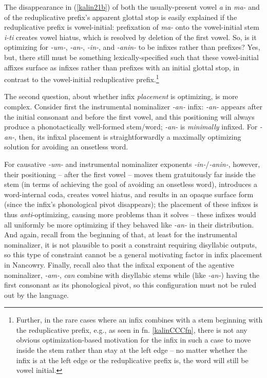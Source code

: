 \documentclass[output=paper]{langscibook}
\begin{document}
\noindent The disappearance in (\ref{kalin21b}) of both the usually-present vowel \textit{a} in \textit{ma-} and of the reduplicative prefix's apparent glottal stop is easily explained if the reduplicative prefix is vowel-initial: prefixation of \textit{ma-} onto the vowel-initial stem \textit{i-ti} creates vowel hiatus, which is resolved by deletion of the first vowel. So, is it optimizing for \textit{-um-}, \textit{-an-}, \textit{-in-}, and \textit{-anin-} to be infixes rather than prefixes? Yes, but, there still must be something lexically-specified such that these vowel-initial affixes surface as infixes rather than prefixes with an initial glottal stop, in contrast to the vowel-initial reduplicative prefix.\footnote{Further, in the rare cases where an infix combines with a stem beginning with the reduplicative prefix, e.g., as seen in fn. \ref{kalinCCCfn}, there is not any obvious optimization-based motivation for the infix in such a case to move inside the stem rather than stay at the left edge -- no matter whether the infix is at the left edge or the reduplicative prefix is, the word will still be vowel initial.}

The second question, about whether infix {\it placement} is optimizing, is more complex. Consider first the instrumental nominalizer \textit{-an-} infix: \textit{-an-} appears after the initial consonant and before the first vowel, and this positioning will always produce a phonotactically well-formed stem/word; \textit{-an-} is {\it minimally} infixed. For \textit{-an-}, then, its infixal placement is straightforwardly a maximally optimizing solution for avoiding an onsetless word. 

For causative \textit{-um-} and instrumental nominalizer exponents \textit{-in-}/\textit{-anin-}, however, their positioning -- after the first vowel -- moves them gratuitously far inside the stem (in terms of achieving the goal of avoiding an onsetless word), introduces a word-internal coda, creates vowel hiatus, and results in an opaque surface form (since the infix's phonological pivot disappears); the placement of these infixes is thus {\it anti}-optimizing, causing more problems than it solves -- these infixes would all uniformly be more optimizing if they behaved like \textit{-an-} in their distribution. And again, recall from the beginning of  that, at least for the instrumental nominalizer, it is not plausible to posit a constraint requiring disyllabic outputs, so this type of constraint cannot be a general motivating factor in infix placement in Nancowry. Finally, recall also that the infixal exponent of the agentive nominalizer, \textit{-am-}, {\it can} combine with disyllabic stems while (like \textit{-an-}) having the first consonant as its phonological pivot, so this configuration must not be ruled out by the language. 
\end{document}
